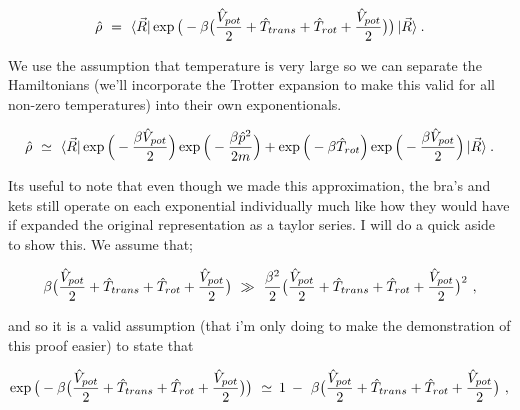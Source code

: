\documentclass{article}
\begin{document}
\begin{equation} \label{eq:1}
\hat{\rho} \hspace{0.125cm} = \hspace{0.125cm} \bra{\vec{R}} \exp \big( - \beta \big( \frac{\hat{V}_{pot}}{2} + \hat{T}_{trans} + \hat{T}_{rot} + \frac{\hat{V}_{pot}}{2} \big) \big) \ket{\vec{R}} \hspace{0.025cm} . 
\end{equation}

We use the assumption that temperature is very large so we can separate the Hamiltonians (we'll incorporate the Trotter expansion to make this valid for all non-zero temperatures) into their own exponentionals. 

\begin{equation} \label{eq:1}
\hat{\rho} \hspace{0.125cm} \simeq \hspace{0.125cm} \bra{\vec{R}} \exp \Big( - \frac{ \beta \hat{V}_{pot}}{2} \Big) \exp \Big( - \frac{\beta \hat{p}^2}{2 m} \Big)  + \exp \Big( - \beta \hat{T}_{rot} \Big) \exp \Big( - \frac{ \beta \hat{V}_{pot}}{2} \Big)  \ket{\vec{R}} \hspace{0.025cm} . \end{equation}

Its useful to note that even though we made this approximation, the bra's and kets still operate on each exponential individually much like how they would have if expanded the original representation as a taylor series. I will do a quick aside to show this. We assume that;

\begin{equation} \label{eq:1}
\beta \big( \frac{\hat{V}_{pot}}{2} + \hat{T}_{trans} + \hat{T}_{rot} + \frac{\hat{V}_{pot}}{2} \big)  \hspace{0.125cm} \gg \hspace{0.125cm} \frac{\beta^2}{2} \big( \frac{\hat{V}_{pot}}{2} + \hat{T}_{trans} + \hat{T}_{rot} + \frac{\hat{V}_{pot}}{2} \big)^2 \hspace{0.125cm} ,
\end{equation}

and so it is a valid assumption (that i'm only doing to make the demonstration of this proof easier) to state that

\begin{equation} \label{eq:1}
\exp \big( - \beta \big( \frac{\hat{V}_{pot}}{2} + \hat{T}_{trans} + \hat{T}_{rot} + \frac{\hat{V}_{pot}}{2} \big) \big) \hspace{0.125cm} \simeq \hspace{0.075cm} 1 \hspace{0.075cm} - \hspace{0.125cm} \beta \big( \frac{\hat{V}_{pot}}{2} + \hat{T}_{trans} + \hat{T}_{rot} + \frac{\hat{V}_{pot}}{2} \big) \hspace{0.125cm} ,
\end{equation}
\end{document}

